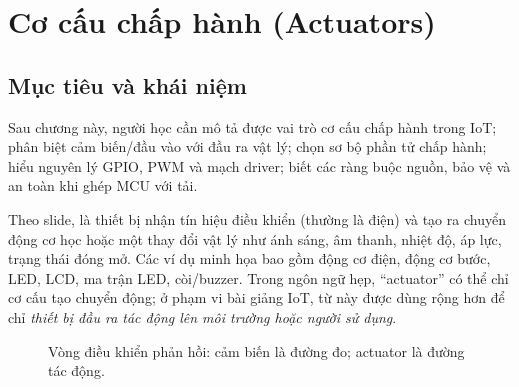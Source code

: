 \chapter{Cơ cấu chấp hành (Actuators)}
\label{chap:act}

\section{Mục tiêu và khái niệm}
Sau chương này, người học cần mô tả được vai trò cơ cấu chấp hành trong IoT; phân biệt cảm biến/đầu vào với đầu ra vật lý; chọn sơ bộ phần tử chấp hành; hiểu nguyên lý GPIO, PWM và mạch driver; biết các ràng buộc nguồn, bảo vệ và an toàn khi ghép MCU với tải.

Theo slide,  là thiết bị nhận tín hiệu điều khiển (thường là điện) và tạo ra chuyển động cơ học hoặc một thay đổi vật lý như ánh sáng, âm thanh, nhiệt độ, áp lực, trạng thái đóng mở. Các ví dụ minh họa bao gồm động cơ điện, động cơ bước, LED, LCD, ma trận LED, còi/buzzer. Trong ngôn ngữ hẹp, ``actuator'' có thể chỉ cơ cấu tạo chuyển động; ở phạm vi bài giảng IoT, từ này được dùng rộng hơn để chỉ \emph{thiết bị đầu ra tác động lên môi trường hoặc người sử dụng}.

\begin{figure}[htbp]\centering
{}
\caption{Vòng điều khiển phản hồi: cảm biến là đường đo; actuator là đường tác động.}
\end{figure}

